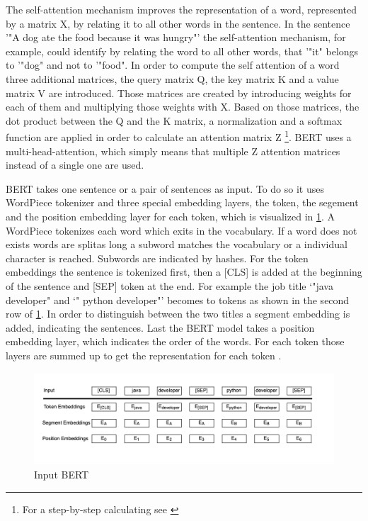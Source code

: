 \documentclass[12pt, a4paper, titlepage]{article}
\begin{document}
The self-attention mechanism improves the representation of a word, represented by a matrix X, by relating it to all other words in the sentence. In the sentence '"A dog ate the food because it was hungry"' \citep[10]{ravichandiran2021} the self-attention mechanism, for example, could identify by relating the word to all other words, that '"it" belongs to '"dog" and not to '"food". 
In order to compute the self attention of a word three additional matrices, the query matrix Q, the key matrix K and a value matrix V are introduced. Those matrices are created by introducing weights for each of them and multiplying those weights with X. Based on those matrices, the dot product between the Q and the K matrix, a normalization and a softmax function are applied in order to calculate an attention matrix Z  \footnote{For a step-by-step calculating see \citep{ravichandiran2021}}. \ac{BERT} uses a multi-head-attention, which simply means that multiple Z attention matrices instead of a single one are used.


\ac{BERT} takes one sentence or a pair of sentences as input. To do so it uses WordPiece tokenizer and three special embedding layers, the token, the segement and the position embedding layer for each token, which is visualized in \ref{fig: F4}. A WordPiece tokenizes each word which exits in the vocabulary. If a word does not exists words are splitas long a subword matches the vocabulary or a individual character is reached. Subwords are indicated by hashes. For the token embeddings the sentence is tokenized first, then a [CLS] is added at the beginning of the sentence and [SEP] token at the end. For example the job title `"java developer" and `" python developer"' becomes to tokens as shown in the second row of \ref{fig: F4}. In order to distinguish between the two titles a segment embedding is added, indicating the sentences. Last the \ac{BERT} model takes a position embedding layer, which indicates the order of the words. For each token those layers are summed up to get the representation for each token \citep{devlin2018,ravichandiran2021}.

\begin{figure}[hb!]
  \center
  \includegraphics[scale=0.5]{BERTInput_own.png}
  \caption{\label{fig: F4} Input \ac{BERT} \citep[5]{devlin2018}}
\end{figure}
\end{document}
